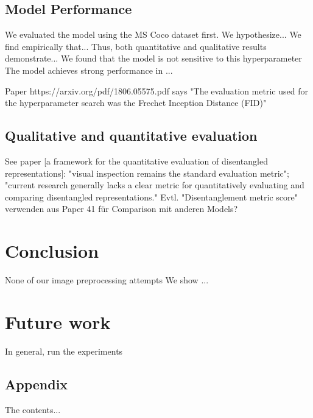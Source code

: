 \documentclass[10pt,letterpaper]{article}
\begin{document}
\subsection{Model Performance}
We evaluated the model using the MS Coco dataset first.
We hypothesize...
We find empirically that...
Thus, both quantitative and qualitative results demonstrate...
We found that the model is not sensitive to this hyperparameter
The model achieves strong performance in ...

\par Paper https://arxiv.org/pdf/1806.05575.pdf says "The evaluation metric used for the hyperparameter search was the Frechet Inception Distance (FID)"

\subsection{Qualitative and quantitative evaluation}
See paper [a framework for the quantitative evaluation of disentangled representations]: "visual inspection remains the standard evaluation
metric"; "current research generally lacks a clear metric for quantitatively evaluating and comparing disentangled representations."
Evtl. "Disentanglement metric score" verwenden aus Paper 41 für Comparison mit anderen Models?

\section{Conclusion}
None of our image preprocessing attempts
We show ...

\section{Future work}
In general, run the experiments

\printbibliography

\begin{appendices}
\section{Appendix}
The contents...
\end{appendices}
\end{document}
